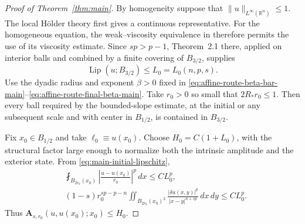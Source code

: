 \documentclass[11pt,reqno]{amsart}
\numberwithin{equation}{section}
\newcommand{\R}{\mathbb R}
\newcommand{\dd}{\,d}
\newcommand{\Lip}{\operatorname{Lip}}
\theoremstyle{remark}
\begin{document}
\begin{proof}[Proof of Theorem~\ref{thm:main}]
By homogeneity suppose that
$\|u\|_{L^\infty(\R^n)}\le1$.  The local H\"older theory first gives a
continuous representative.  For the homogeneous equation, the
weak--viscosity equivalence in
\cite[Proposition~1.5]{BiswasTopp} therefore permits the use of its
viscosity estimate.  Since \(sp>p-1\), Theorem~2.1 there, applied on
interior balls and combined by a finite covering of \(B_{3/2}\),
supplies
\begin{equation}
 \Lip(u;B_{3/2})\le L_0=L_0(n,p,s).
 \label{eq:main-initial-lipschitz}
\end{equation}
Use the dyadic radius and exponent \(\beta>0\) fixed in
\eqref{eq:affine-route-beta-bar-main}--\eqref{eq:affine-route-final-beta-main}.  Take \(r_0>0\) so small that
\(2R_*r_0\le1\).  Then every ball required by the bounded-slope
estimate, at the initial or any subsequent scale and with center in
\(B_{1/2}\), is contained in \(B_{3/2}\).

Fix \(x_0\in B_{1/2}\) and take \(\ell_0\equiv u(x_0)\).  Choose
\(H_0=C(1+L_0)\), with the structural factor
large enough to normalize both the intrinsic amplitude and the exterior
state.  From \eqref{eq:main-initial-lipschitz},
\begin{align*}
& \fint_{B_{2r_0}(x_0)}
 \left|\frac{u-u(x_0)}{r_0}\right|^p\dd x
 \le C L_0^p,\\
 &(1-s)r_0^{sp-p-n}
 \iint_{B_{2r_0}(x_0)^2}
 \frac{|\delta u(x,y)|^p}{|x-y|^{n+sp}}\dd x\!\dd y
 \le C L_0^p.
\end{align*}
Thus \(\mathbf A_{s,r_0}(u,u(x_0);x_0)\le H_0\).


\end{proof}
\end{document}
